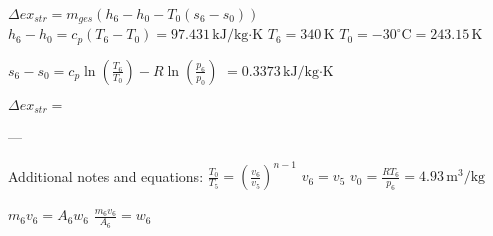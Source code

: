 \( \Delta ex_{str} = m_{ges} (h_6 - h_0 - T_0 (s_6 - s_0)) \)  
\( h_6 - h_0 = c_p (T_6 - T_0) = 97.431 \, \text{kJ/kg·K} \)  
\( T_6 = 340 \, \text{K} \)  
\( T_0 = -30^\circ \text{C} = 243.15 \, \text{K} \)  

\( s_6 - s_0 = c_p \ln \left( \frac{T_6}{T_0} \right) - R \ln \left( \frac{p_6}{p_0} \right) \)  
\( = 0.3373 \, \text{kJ/kg·K} \)  

\( \Delta ex_{str} = \)

---

Additional notes and equations:  
\( \frac{T_0}{T_5} = \left( \frac{v_6}{v_5} \right)^{n-1} \)  
\( v_6 = v_5 \)  
\( v_0 = \frac{R T_6}{p_6} = 4.93 \, \text{m}^3/\text{kg} \)  

\( m_6 v_6 = A_6 w_6 \)  
\( \frac{m_6 v_6}{A_6} = w_6 \)